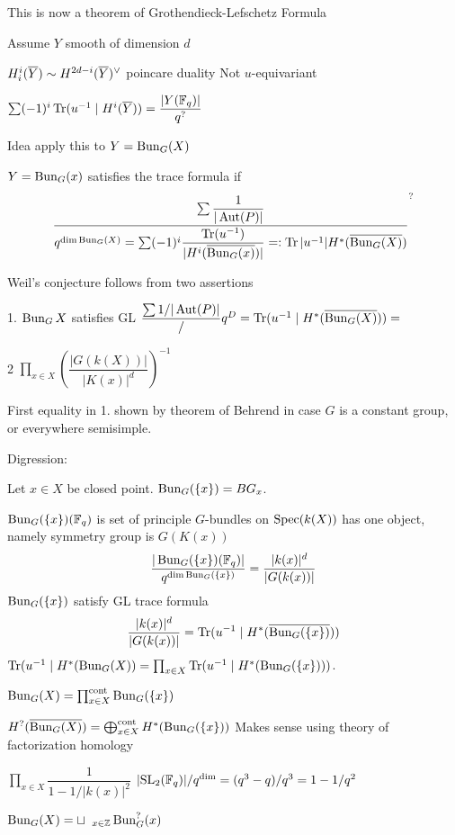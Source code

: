 This is now a theorem of Grothendieck-Lefschetz Formula


Assume $Y$ smooth of dimension $d$

$H_i^i(\overline{Y}) \sim H^{2d-i}(\overline{Y})^\vee$ poincare duality
Not $u$-equivariant

$\sum (-1)^i \operatorname{Tr}(u^{-1} \;|\; H^i(\overline{Y}))= \dfrac{|Y(\mathbb{F}_q)|}{q^?}$



Idea apply this to $Y= \operatorname{Bun}_G(X)$

\begin{dfn}
$Y= \operatorname{Bun}_G(x)$ satisfies the trace formula if
	\[
	\dfrac{ \sum \dfrac{1}{|\operatorname{Aut}(P)|}}{ q^{\dim \operatorname{Bun}_G(X)}= \sum (-1)^i \dfrac{\operatorname{Tr}(u^{-1})}{|H^i(\overline{\operatorname{Bun}_G(x)})|} =: \operatorname{Tr}|u^{-1}| H^*(\overline{\operatorname{Bun}_G(X)})}^?
	\]
\end{dfn}


Weil's conjecture follows from two assertions

1. $\operatorname{Bun}_G X$ satisfies GL
$\dfrac{\sum 1/|\operatorname{Aut}(P)|}/q^D= \operatorname{Tr}(u^{-1}\;|\; H^*(\overline{\operatorname{Bun}_G(X)}))= $

2 $\prod_{x \in X} \left(\dfrac{|G(k(X))|}{|K(x)|^d}\right)^{-1}$



First equality in 1. shown by theorem of Behrend in case $G$ is a constant group, or everywhere semisimple. 


Digression:

Let $x \in X$ be closed point. $\operatorname{Bun}_G(\{x\})= BG_x$.


$\operatorname{Bun}_G(\{x\})(\mathbb{F}_q)$ is set of principle $G$-bundles on $\operatorname{Spec}(k(X))$
has one object, namely symmetry group is $G(K(x))$
	\[
	\dfrac{|\operatorname{Bun}_G(\{x\})(\mathbb{F}_q)|}{q^{\dim \operatorname{Bun}_G(\{x\})}}= \dfrac{|k(x)|^d}{|G(k(x))|}
	\]
$\operatorname{Bun}_G(\{x\})$ satisfy GL trace formula
	\[
	\dfrac{|k(x)|^d}{|G(k(x))|}= \operatorname{Tr}(u^{-1} \;|\; H^*(\overline{\operatorname{Bun}_G(\{x\})}))
	\]
$\operatorname{Tr}(u^{-1} \;|\; H^*(\operatorname{Bun}_G(X))= \prod_{x \in X} \operatorname{Tr}(u^{-1}\;|\; H^*(\operatorname{Bun}_G(\{x\})))$.

$\operatorname{Bun}_G(X)= \prod_{x \in X}^\text{cont} \operatorname{Bun}_G(\{x\})$

$H^?(\overline{\operatorname{Bun}_G(X)})= \bigoplus_{x \in X}^\text{cont} H^*(\operatorname{Bun}_G(\{x\}))$
Makes sense using theory of factorization homology

$\prod_{x \in X} \dfrac{1}{1- 1/|k(x)|^2}$
$|\text{SL}_2(\mathbb{F}_q)|/q^{\dim}= (q^3-q)/q^3= 1-1/q^2$

$\operatorname{Bun}_G(X)= \sqcup \phantom{a}_{x \in \mathbb{Z}} \operatorname{Bun}_G^?(x)$


































